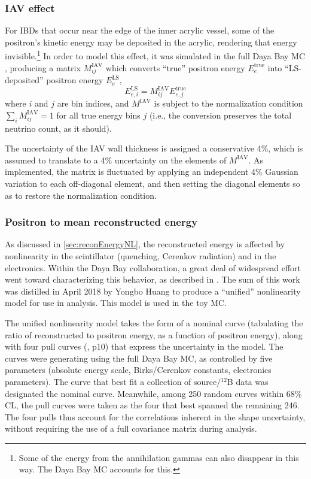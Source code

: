 \documentclass[../thesis.tex]{subfiles}
\begin{document}
\subsubsection{IAV effect}

\newcommand\Miav{M^{\mathrm{IAV}}}
\newcommand\Eetrue[1]{E^{\mathrm{true}}_{e#1}}
\newcommand\Eels[1]{E^{\mathrm{LS}}_{e#1}}

For IBDs that occur near the edge of the inner acrylic vessel, some of the positron's kinetic energy may be deposited in the acrylic, rendering that energy invisible.\footnote{Some of the energy from the annihilation gammas can also disappear in this way. The Daya Bay MC accounts for this.} In order to model this effect, it was simulated in the full Daya Bay MC \cite{TruePromptSpec}, producing a matrix $\Miav_{ij}$ which converts ``true'' positron energy $\Eetrue{}$ into ``LS-deposited'' positron energy $\Eels{}$,
\begin{equation}
  \Eels{,i} = \Miav_{ij} \Eetrue{,j}
\end{equation}
where $i$ and $j$ are bin indices, and $\Miav$ is subject to the normalization condition $\sum_i\Miav_{ij} = 1$ for all true energy bins $j$ (i.e., the conversion preserves the total neutrino count, as it should).

The uncertainty of the IAV wall thickness is assigned a conservative 4\%, which is assumed to translate to a 4\% uncertainty on the elements of $\Miav$. As implemented, the matrix is fluctuated by applying an independent 4\% Gaussian variation to each off-diagonal element, and then setting the diagonal elements so as to restore the normalization condition.

\subsubsection{Positron to mean reconstructed energy}

As discussed in \autoref{sec:reconEnergyNL}, the reconstructed energy is affected by nonlinearity in the scintillator (quenching, Cerenkov radiation) and in the electronics. Within the Daya Bay collaboration, a great deal of widespread effort went toward characterizing this behavior, as described in \cite{NonlinearityPaper}. The sum of this work was distilled in April 2018 by Yongbo Huang \cite{EnergyModelUpdateYongbo} to produce a ``unified'' nonlinearity model for use in analysis. This model is used in the toy MC.

The unified nonlinearity model takes the form of a nominal curve (tabulating the ratio of reconstructed to positron energy, as a function of positron energy), along with four pull curves (\cite{EnergyModelUpdateSoeren}, p10) that express the uncertainty in the model. The curves were generating using the full Daya Bay MC, as controlled by five parameters (absolute energy scale, Birks/Cerenkov constants, electronics parameters). The curve that best fit a collection of source/$^{12}$B data was designated the nominal curve. Meanwhile, among 250 random curves within 68\% CL, the pull curves were taken as the four that best spanned the remaining 246. The four pulls thus account for the correlations inherent in the shape uncertainty, without requiring the use of a full covariance matrix during analysis.
\end{document}
